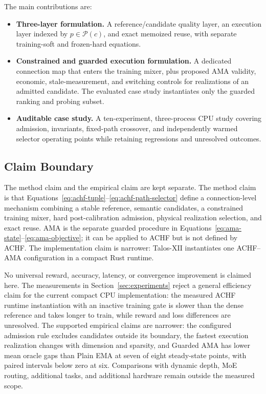 \documentclass{article}
\newcommand{\ama}{\textsc{AMA}}
\begin{document}
The main contributions are:

\begin{itemize}[leftmargin=*]
\item \textbf{Three-layer formulation.} A reference/candidate quality layer,
an execution layer indexed by $p\in\mathcal{P}(c)$, and exact memoized reuse,
with separate training-soft and frozen-hard equations.
\item \textbf{Constrained and guarded execution formulation.} A dedicated
connection map that enters the training mixer, plus proposed \ama{} validity,
economic, stale-measurement, and switching controls for realizations of an
admitted candidate. The evaluated case study instantiates only the guarded
ranking and probing subset.
\item \textbf{Auditable case study.} A ten-experiment, three-process CPU study
covering admission, invariants, fixed-path crossover, and independently warmed
selector operating points while retaining regressions and unresolved outcomes.
\end{itemize}

\subsection{Claim Boundary}

The method claim and the empirical claim are kept separate. The method claim is
that Equations~\eqref{eq:achf-tuple}--\eqref{eq:achf-path-selector} define a
connection-level mechanism combining a stable reference, semantic candidates,
a constrained training mixer, hard post-calibration admission, physical
realization selection, and exact reuse. \ama{} is the separate guarded procedure in
Equations~\eqref{eq:ama-state}--\eqref{eq:ama-objective}; it can be applied to
ACHF but is not defined by ACHF. The implementation claim is narrower:
Talos-XII instantiates one ACHF--\ama{} configuration in a compact Rust runtime.

No universal reward, accuracy, latency, or convergence improvement is claimed
here. The measurements in Section~\ref{sec:experiments} reject a general
efficiency claim for the current compact CPU implementation: the measured ACHF
runtime instantiation with an inactive training gate is
slower than the dense reference and takes longer to train, while reward and
loss differences are unresolved. The supported empirical claims are narrower:
the configured admission rule excludes candidates outside its boundary, the
fastest execution realization changes with dimension and sparsity, and Guarded
\ama{} has lower mean oracle gaps than Plain EMA at seven of eight steady-state
points, with paired intervals below zero at six. Comparisons with dynamic depth, MoE routing,
additional tasks, and additional hardware remain outside the measured scope.
\end{document}
